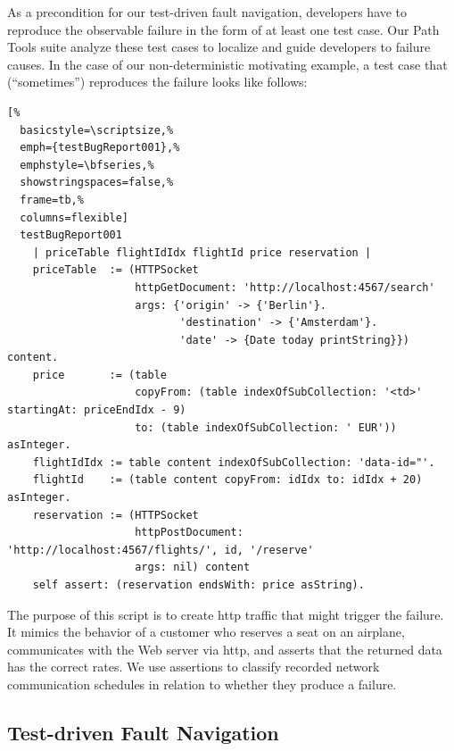 \documentclass[preprint,3p]{elsarticle}
\newcommand{\ac}[1]{\gls{#1}}
\begin{document}
As a precondition for our test-driven fault navigation, developers have to reproduce the observable failure in the form of at least one test case.
Our Path Tools suite analyze these test cases to localize and guide developers to failure causes.
In the case of our non-deterministic motivating example, a test case that (``sometimes'') reproduces the failure looks like follows:

\begin{lstlisting}[%
  basicstyle=\scriptsize,%
  emph={testBugReport001},%
  emphstyle=\bfseries,%
  showstringspaces=false,%
  frame=tb,%
  columns=flexible]
  testBugReport001
    | priceTable flightIdIdx flightId price reservation |
    priceTable  := (HTTPSocket
                    httpGetDocument: 'http://localhost:4567/search'
                    args: {'origin' -> {'Berlin'}.
                           'destination' -> {'Amsterdam'}.
                           'date' -> {Date today printString}}) content.
    price       := (table
                    copyFrom: (table indexOfSubCollection: '<td>' startingAt: priceEndIdx - 9)
                    to: (table indexOfSubCollection: ' EUR')) asInteger.
    flightIdIdx := table content indexOfSubCollection: 'data-id="'.
    flightId    := (table content copyFrom: idIdx to: idIdx + 20) asInteger.
    reservation := (HTTPSocket
                    httpPostDocument: 'http://localhost:4567/flights/', id, '/reserve'
                    args: nil) content
    self assert: (reservation endsWith: price asString).
\end{lstlisting}

The purpose of this script is to create \ac{http} traffic that might trigger the
failure.  It mimics the behavior of a customer who reserves a seat on an
airplane, communicates with the Web server via \ac{http}, and asserts that the
returned data has the correct rates.  We use assertions to classify recorded
network communication schedules in relation to whether they produce a failure.


\subsection{Test-driven Fault Navigation}
\end{document}
